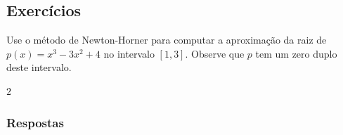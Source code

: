 \subsection{Exercícios}

\badgeRevisar

\begin{exer}
  Use o método de Newton-Horner para computar a aproximação da raiz de $p(x) = x^3 - 3x^2 + 4$ no intervalo $[1, 3]$. Observe que $p$ tem um zero duplo deste intervalo.
\end{exer}
\begin{resp}
  $2$
\end{resp}

\ifisbook
\subsubsection{Respostas}
\shipoutAnswer
\fi

